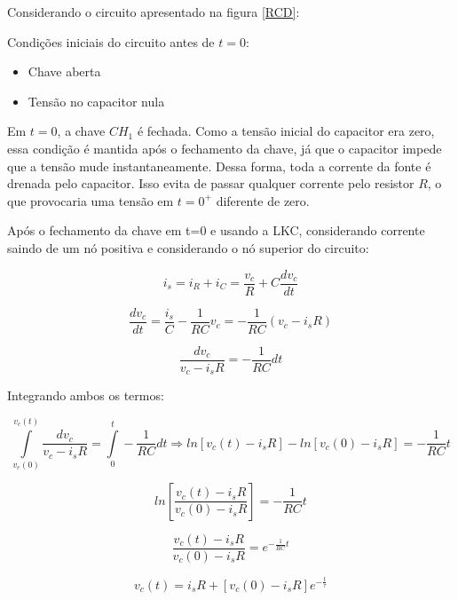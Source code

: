 \documentclass[12pt,fleqn]{book} %
\begin{document}
{Considerando o circuito apresentado na figura \ref{RCD}:

Condições iniciais do circuito antes de $t=0$:

\begin{itemize}
\item Chave aberta
\item Tensão no capacitor nula
\end{itemize}

Em $t=0$, a chave $CH_1$ é fechada. Como a tensão inicial do capacitor era zero, essa condição é mantida após o fechamento da chave, já que o capacitor impede que a tensão mude instantaneamente. Dessa forma, toda a corrente da fonte é drenada pelo capacitor. Isso evita de passar qualquer corrente pelo resistor $R$, o que provocaria uma tensão em $t=0^+$ diferente de zero.

Após o fechamento da chave em t=0 e usando a LKC, considerando corrente saindo de um nó positiva e considerando o nó superior do circuito:

\begin{equation}
i_s=i_R+i_C=\frac{v_c}{R}+C\frac{dv_c}{dt}
\end{equation}

\begin{equation}
\frac{dv_c}{dt}=\frac{i_s}{C}-\frac{1}{RC} v_c=-\frac{1}{RC} (v_c-i_sR)
\end{equation}

\begin{equation}
\frac{dv_c}{v_c-i_sR} = -\frac{1}{RC}dt
\end{equation}

Integrando ambos os termos:

\begin{equation}
\int\limits_{v_c(0)}^{v_c(t)}\frac{dv_c}{v_c-i_sR} =\int\limits_{0}^{t} -\frac{1}{RC}dt \Rightarrow ln[v_c(t)-i_sR]-ln[v_c(0)-i_sR]=-\frac{1}{RC}t 
\end{equation}

\begin{equation}
ln[\frac{v_c(t)-i_sR}{v_c(0)-i_sR}] = -\frac{1}{RC}t 
\end{equation}

\begin{equation}
\frac{v_c(t)-i_sR}{v_c(0)-i_sR} = e^{-\frac{1}{RC}t}
\end{equation}

\begin{equation}
v_c(t) = i_sR + [v_c(0)-i_sR]e^{-\frac{t}{\tau}}
\end{equation}

}
\end{document}
